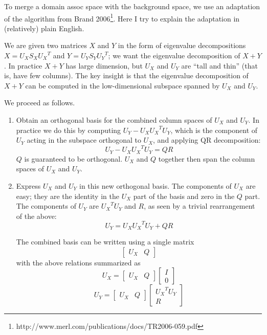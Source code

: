 \documentclass[english]{article}
\begin{document}
To merge a domain assoc space with the background space, we use an adaptation of the algorithm from Brand 2006\footnote{http://www.merl.com/publications/docs/TR2006-059.pdf}.  Here I try to explain the adaptation in (relatively) plain English.

We are given two matrices $X$ and $Y$ in the form of eigenvalue decompositions $X = U_X S_X {U_X}^T$ and $Y = U_Y S_Y {U_Y}^T$; we want the eigenvalue decomposition of $X + Y$.  In practice $X + Y$ has large dimension, but $U_X$ and $U_Y$ are ``tall and thin'' (that is, have few columns).  The key insight is that the eigenvalue decomposition of $X + Y$ can be computed in the low-dimensional subspace spanned by $U_X$ and $U_Y$.

We proceed as follows.

\begin{enumerate}

\item Obtain an orthogonal basis for the combined column spaces of $U_X$ and $U_Y$.  In practice we do this by computing $U_Y - U_X {U_X}^T U_Y$, which is the component of $U_Y$ acting in the subspace orthogonal to $U_X$, and applying QR decomposition:
\begin{equation}\label{QR} U_Y - U_X {U_X}^T U_Y = Q R \end{equation}
$Q$ is guaranteed to be orthogonal.  $U_X$ and $Q$ together then span the column spaces of $U_X$ and $U_Y$.

\item Express $U_X$ and $U_Y$ in this new orthogonal basis.  The components of $U_X$ are easy; they are the identity in the $U_X$ part of the basis and zero in the $Q$ part.  The components of $U_Y$ are ${U_X}^T U_Y$ and $R$, as seen by a trivial rearrangement of the above:
\[U_Y = U_X {U_X}^T U_Y + Q R\]

The combined basis can be written using a single matrix
\[\left[\begin{array}{cc} U_X & Q\end{array}\right]\]
with the above relations summarized as
\[U_X = \left[\begin{array}{cc} U_X & Q\end{array}\right] \left[\begin{array}{c} I \\ 0\end{array}\right]\]
\[U_Y = \left[\begin{array}{cc} U_X & Q\end{array}\right] \left[\begin{array}{c} {U_X}^T U_Y \\ R\end{array}\right]\]


\end{enumerate}
\end{document}
